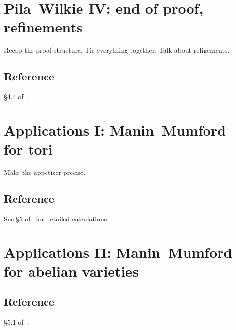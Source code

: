 \documentclass[10pt, a4paper]{amsart}
\begin{document}
\section{Pila--Wilkie IV: end of proof, refinements}

Recap the proof structure.
Tie everything together.
Talk about refinements.

\subsection*{Reference} \S4.4 of~\cite{scanlon}.

\section{Applications I: Manin--Mumford for tori}

Make the appetizer precise.

\subsection*{Reference}
See \S5 of~\cite{csp} for detailed calculations.

\section{Applications II: Manin--Mumford for abelian varieties}

\subsection*{Reference} \S5.1 of~\cite{scanlon}.

\printbibliography
\end{document}
